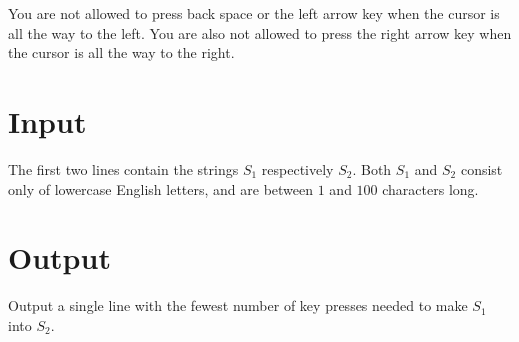 You are not allowed to press back space or the left arrow key when the cursor is all the way to the left. You are also not allowed to press the right arrow key when the cursor is all the way to the right. 

\section*{Input}
The first two lines contain the strings $S_1$ respectively $S_2$. Both $S_1$ and $S_2$ consist only of lowercase English letters, and are between $1$ and $100$ characters long.

\section*{Output}
Output a single line with the fewest number of key presses needed to make $S_1$ into $S_2$.
